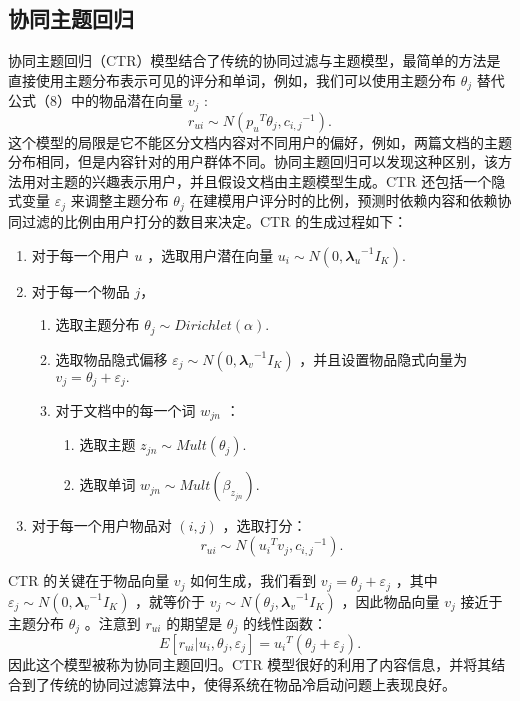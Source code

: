 \subsection{协同主题回归} %
\label{sub:协同主题回归}
协同主题回归（CTR）模型结合了传统的协同过滤与主题模型，最简单的方法是直接使用主题分布表示可见的评分和单词，例如，我们可以使用主题分布 $\theta_j​$ 替代公式（8）中的物品潜在向量 $v_j​$ :
$$
r_{ui} \sim N({p_u}^T\theta_j, {c_{i,j}}^{-1}).
$$
这个模型的局限是它不能区分文档内容对不同用户的偏好，例如，两篇文档的主题分布相同，但是内容针对的用户群体不同。协同主题回归可以发现这种区别，该方法用对主题的兴趣表示用户，并且假设文档由主题模型生成。CTR 还包括一个隐式变量 $\varepsilon_j​$ 来调整主题分布 $\theta_j​$ 在建模用户评分时的比例，预测时依赖内容和依赖协同过滤的比例由用户打分的数目来决定。CTR 的生成过程如下：
\begin{enumerate}[itemindent=1em]
	\item 对于每一个用户 $u$ ，选取用户潜在向量 $ u_i \sim N(0, {𝝀_u}^{-1}I_K). $
	
	\item 对于每一个物品 $j​$，
	\begin{enumerate}[itemindent=1em]
		\item 选取主题分布 $\theta_j \sim Dirichlet(𝛼).$
		\item 选取物品隐式偏移 $\varepsilon_j \sim N(0, {𝝀_v}^{-1}I_K)$ ，并且设置物品隐式向量为 $v_j = \theta_j + \varepsilon_j.$
		\item 对于文档中的每一个词 $w_{jn}$ ：
		\begin{enumerate}[itemindent=1em]
			\item 选取主题 $z_{jn} \sim Mult(\theta_j). $
			\item 选取单词 $w_{jn} \sim Mult(\beta_{z_{jn}}).$ 
		\end{enumerate}
	\end{enumerate}
	\item 对于每一个用户物品对 $(i,j)$ ，选取打分：
			$$
			r_{ui} \sim N({u_i}^Tv_j, {c_{i,j}}^{-1}).
			$$
\end{enumerate}
CTR 的关键在于物品向量 $v_j$ 如何生成，我们看到 $v_j = \theta_j + \varepsilon_j$ ，其中 $\varepsilon_j \sim N(0, {𝝀_v}^{-1}I_K)$ ，就等价于 $v_j \sim N(\theta_j, {𝝀_v}^{-1}I_K)$  ，因此物品向量 $v_j$ 接近于主题分布 $\theta_j$ 。注意到 $r_{ui}$ 的期望是 $\theta_j$ 的线性函数：
$$
E[r_{ui} | u_i, \theta_j, \varepsilon_j] = {u_i}^T (\theta_j +  \varepsilon_j).
$$
因此这个模型被称为协同主题回归。CTR 模型很好的利用了内容信息，并将其结合到了传统的协同过滤算法中，使得系统在物品冷启动问题上表现良好。

